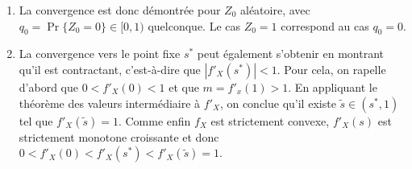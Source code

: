 \remarks
\begin{enumerate}
 \item La convergence est donc démontrée pour $Z_0$ aléatoire, avec $q_0 = \Pr\{Z_0 = 0\} \in [0, 1)$ quelconque. Le cas $Z_0 = 1$ correspond au cas $q_0 = 0$.
 \item La convergence vers le point fixe $s^*$ peut également s'obtenir en montrant qu'il est contractant, c'est-à-dire que $|f'_X(s^*)| < 1$. Pour cela, on rapelle d'abord que $0 < f'_X(0) < 1$ et que $m = f'_x(1) > 1$. En appliquant le théorème des valeurs intermédiaire à $f'_X$, on conclue qu'il existe $\widetilde{s} \in (s^*, 1)$ tel que $f'_X(\widetilde{s}) = 1$. Comme enfin $f_X$ est strictement convexe, $f'_X(s)$ est strictement monotone croissante et donc $0 < f'_X(0) < f'_X(s^*) < f'_X(\widetilde{s}) = 1$.
\end{enumerate}


